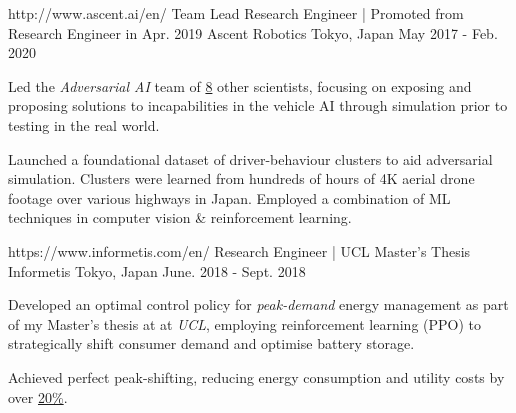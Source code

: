 \begin{cventries}
  \cventry
    {http://www.ascent.ai/en/}
    {Team Lead Research Engineer | Promoted from Research Engineer in Apr. 2019} %
    {Ascent Robotics} %
    {Tokyo, Japan} %
    {May 2017 - Feb. 2020} %
    {
      \begin{cvitems} %
        \item {Led the \textit{Adversarial AI} team of \underline{8} other scientists, focusing on exposing and proposing solutions to incapabilities in the vehicle AI through simulation prior to testing in the real world.}
        \item {Launched a foundational dataset of driver-behaviour clusters to aid adversarial simulation. Clusters were learned from hundreds of hours of 4K aerial drone footage over various highways in Japan. Employed a combination of ML techniques in computer vision \& reinforcement learning.}
      \end{cvitems}
    }

  \cventry
    {https://www.informetis.com/en/}
    {Research Engineer | UCL Master's Thesis} %
    {Informetis} %
    {Tokyo, Japan} %
    {June. 2018 - Sept. 2018} %
    {
      \begin{cvitems} %
        \item {Developed an optimal control policy for \emph{peak-demand} energy management as part of my Master's thesis at at \emph{UCL}, employing reinforcement learning (PPO) to strategically shift consumer demand and optimise battery storage.}
        \item {Achieved perfect peak-shifting, reducing energy consumption and utility costs by over \underline{20\%}.}
      \end{cvitems}
    }


\end{cventries}
